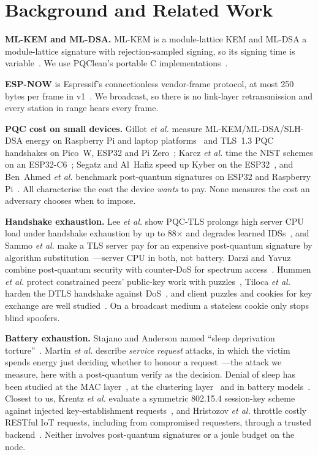 \documentclass[conference]{IEEEtran}
\begin{document}
\section{Background and Related Work}
\textbf{ML-KEM and ML-DSA.} ML-KEM is a module-lattice KEM and ML-DSA a module-lattice signature with
rejection-sampled signing, so its signing time is variable~\cite{fips203,fips204}. We use PQClean's portable C
implementations~\cite{pqclean}.

\textbf{ESP-NOW} is Espressif's connectionless vendor-frame protocol, at most 250\,bytes per frame in v1~\cite{espnow}.
We broadcast, so there is no link-layer retransmission and every station in range hears every frame.

\textbf{PQC cost on small devices.} Gillot \emph{et al.} measure ML-KEM/ML-DSA/SLH-DSA energy on Raspberry Pi and
laptop platforms~\cite{gillot1} and TLS~1.3 PQC handshakes on Pico~W, ESP32 and Pi Zero~\cite{gillot2}; Karcz
\emph{et al.} time the NIST schemes on an ESP32-C6~\cite{karcz}; Segatz and Al~Hafiz speed up Kyber on the
ESP32~\cite{segatz}, and Ben~Ahmed \emph{et al.} benchmark post-quantum signatures on ESP32 and Raspberry
Pi~\cite{benahmed}. All characterise the cost the device \emph{wants} to pay. None measures the cost an adversary
chooses when to impose.

\textbf{Handshake exhaustion.} Lee \emph{et al.} show PQC-TLS prolongs high server CPU load under handshake
exhaustion by up to 88$\times$ and degrades learned IDSs~\cite{leetls}, and Sammo \emph{et al.} make a TLS server
pay for an expensive post-quantum signature by algorithm substitution~\cite{sammo}---server CPU in both, not
battery. Darzi and Yavuz combine post-quantum security with counter-DoS for spectrum access~\cite{darzi}. Hummen
\emph{et al.} protect constrained peers' public-key work with puzzles~\cite{hummen}, Tiloca \emph{et al.} harden the
DTLS handshake against DoS~\cite{tiloca}, and client puzzles and cookies for key exchange are well
studied~\cite{aura,stebila,rfc8019}. On a broadcast medium a stateless cookie only stops blind spoofers.

\textbf{Battery exhaustion.} Stajano and Anderson named ``sleep deprivation torture''~\cite{stajano}. Martin
\emph{et al.} describe \emph{service request} attacks, in which the victim spends energy just deciding whether to
honour a request~\cite{martin}---the attack we measure, here with a post-quantum verify as the decision. Denial of
sleep has been studied at the MAC layer~\cite{raymond}, at the clustering layer~\cite{pirretti} and in battery
models~\cite{kuaban}. Closest to us, Krentz \emph{et al.} evaluate a symmetric 802.15.4 session-key scheme against
injected key-establishment requests~\cite{krentz}, and Hristozov \emph{et al.} throttle costly RESTful IoT requests,
including from compromised requesters, through a trusted backend~\cite{hristozov}. Neither involves post-quantum
signatures or a joule budget on the node.
\end{document}
